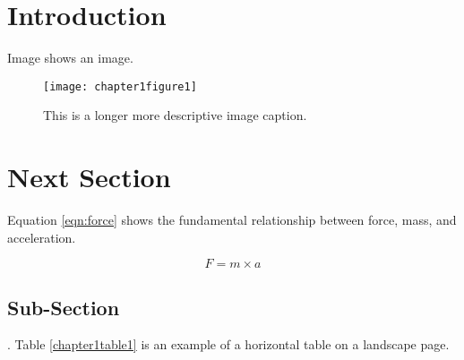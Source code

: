  \section{Introduction}
 
\lipsum[5-7] Image shows an image.

 \renewcommand{\baselinestretch}{1.5}
\begin{figure}[!htbp]
	\centering
	\texttt{[image: chapter1figure1]}
	\caption[This title will appear in the TOC]{This is a longer more descriptive image caption.}
	\label{fig:chapter1figure1}		
\end{figure}
\renewcommand{\baselinestretch}{2.0}

\lipsum[7-8]
 
 
\section{Next Section}
 
\lipsum[9-10] Equation \ref{eqn:force} shows the fundamental relationship between force, mass, and acceleration. 

 	\begin{equation}
	F = m\times a
	\label{eqn:force}
	\end{equation}
	
\lipsum[11]

\subsection{Sub-Section}

\lipsum[1]. Table \ref{chapter1table1} is an example of a horizontal table on a landscape page.

